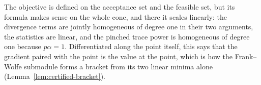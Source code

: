 
The objective is defined on the acceptance set and the feasible set, but its
formula makes sense on the whole cone, and there it scales linearly: the
divergence terms are jointly homogeneous of degree one in their two
arguments, the statistics are linear, and the pinched trace power is
homogeneous of degree one because $p\alpha=1$. Differentiated along the point
itself, this says that the gradient paired with the point is the value at the
point, which is how the Frank--Wolfe submodule forms a bracket from its two
linear minima alone (Lemma~\ref{lem:certified-bracket}).

